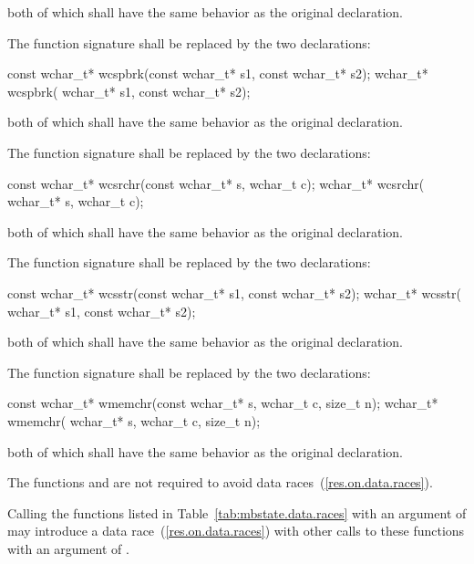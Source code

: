both of which shall have the same behavior as the original declaration.

\pnum
{}%
The function signature
shall be replaced by the two declarations:

\begin{codeblock}
const wchar_t* wcspbrk(const wchar_t* s1, const wchar_t* s2);
      wchar_t* wcspbrk(      wchar_t* s1, const wchar_t* s2);
\end{codeblock}

both of which shall have the same behavior as the original declaration.

\pnum
{}%
The function signature
shall be replaced by the two declarations:

\begin{codeblock}
const wchar_t* wcsrchr(const wchar_t* s, wchar_t c);
      wchar_t* wcsrchr(      wchar_t* s, wchar_t c);
\end{codeblock}

both of which shall have the same behavior as the original declaration.

\pnum
{}%
The function signature
shall be replaced by the two declarations:

\begin{codeblock}
const wchar_t* wcsstr(const wchar_t* s1, const wchar_t* s2);
      wchar_t* wcsstr(      wchar_t* s1, const wchar_t* s2);
\end{codeblock}

both of which shall have the same behavior as the original declaration.

\pnum
{}%
The function signature
shall be replaced by the two declarations:

\begin{codeblock}
const wchar_t* wmemchr(const wchar_t* s, wchar_t c, size_t n);
      wchar_t* wmemchr(      wchar_t* s, wchar_t c, size_t n);
\end{codeblock}

both of which shall have the same behavior as the original declaration.

\pnum
The functions  and  are not required to avoid data
races~(\ref{res.on.data.races}).

\pnum
Calling the functions listed in Table~\ref{tab:mbstate.data.races} with an  argument of
 may introduce a data race~(\ref{res.on.data.races}) with other calls to
these functions with an  argument of .

